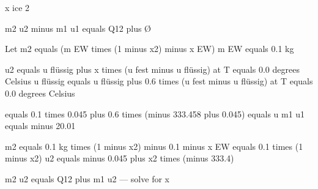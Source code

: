 x ice 2  

m2 u2 minus m1 u1 equals Q12 plus Ø  

Let m2 equals (m EW times (1 minus x2) minus x EW)  
m EW equals 0.1 kg  

u2 equals u flüssig plus x times (u fest minus u flüssig) at T equals 0.0 degrees Celsius  
u flüssig equals u flüssig plus 0.6 times (u fest minus u flüssig) at T equals 0.0 degrees Celsius  

equals 0.1 times 0.045 plus 0.6 times (minus 333.458 plus 0.045) equals u m1 u1  
equals minus 20.01  

m2 equals 0.1 kg times (1 minus x2) minus 0.1 minus x EW equals 0.1 times (1 minus x2)  
u2 equals minus 0.045 plus x2 times (minus 333.4)  

m2 u2 equals Q12 plus m1 u2 — solve for x
